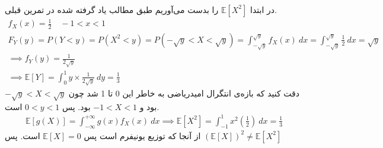 \\
در ابتدا
$\mathbb{E} [X^2]$
را بدست می‌آوریم طبق مطالب یاد گرفته شده در تمرین قبلی.
\begin{gather*}
    f_X(x) = \frac{1}{2} \quad -1 < x < 1\\
    F_Y(y) = P(Y < y) = P(X^2 < y) = P(-\sqrt{y} < X < \sqrt{y}) = \int_{-\sqrt{y}}^{\sqrt{y}} f_X(x) ~ dx =
    \int_{-\sqrt{y}}^{\sqrt{y}} \frac{1}{2} ~ dx = \sqrt{y}\\
    \implies f_Y(y) = \frac{1}{2\sqrt{y}}\\
    \implies \mathbb{E} [Y] = \int_{0}^{1} y \times \frac{1}{2\sqrt{y}} ~ dy = \frac{1}{3}
\end{gather*}
دقت کنید که بازه‌ی انتگرال امیدریاضی به خاطر این 0 تا 1 شد چون
$-\sqrt{y} < X < \sqrt{y}$
بود و
$-1 < X < 1$
بود. پس
$0 < y < 1$
است.
\\
\begin{gather*}
    \mathbb{E} [g(X)] = \int_{-\infty}^{+\infty} g(x) f_X(x) ~ dx \implies
    \mathbb{E} [X^2] = \int_{-1}^{1} x^2 (\frac{1}{2}) ~ dx = \frac{1}{3}
\end{gather*}
از آنجا که توزیع یونیفرم است پس
$\mathbb{E} [X] = 0$
است.
پس
$(\mathbb{E} [X])^2 \neq \mathbb{E} [X^2]$




